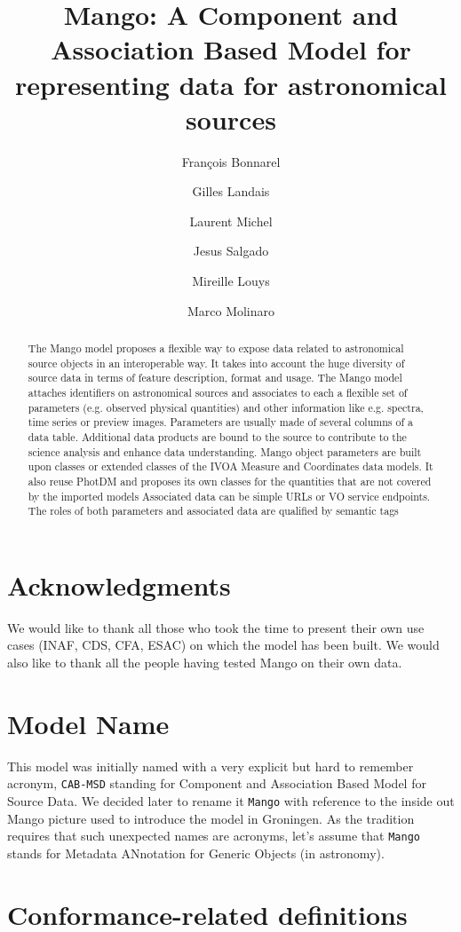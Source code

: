 \documentclass[11pt,a4paper]{ivoa}
\title{Mango: A Component and Association Based Model for representing data for astronomical sources}
\author{François Bonnarel}
\author{Gilles Landais}
\author{Laurent Michel}
\author{Jesus Salgado}
\author{Mireille Louys}
\author{Marco Molinaro}
\begin{document}
\begin{abstract}
The Mango model proposes a flexible way to expose data related to astronomical source objects 
in an interoperable way.
It takes into account the huge diversity of source data in terms of feature description, format and usage.
The Mango model attaches identifiers on astronomical sources and associates to each a flexible 
set of parameters (e.g. observed physical quantities) and other information like e.g. spectra,
time series or preview images.
Parameters are usually made of several columns of a data table.
Additional data products are bound to the source to contribute to the science analysis
and enhance data understanding.
Mango object parameters are built upon classes or extended classes of the IVOA Measure
and Coordinates data models. It also reuse PhotDM and proposes its own classes for the quantities 
that are not covered by the imported models
Associated data can be simple URLs or VO service endpoints.
The roles of both parameters and associated data are qualified by semantic tags

\end{abstract}


\section*{Acknowledgments}

We would like to thank all those who took the time to present their own use cases (INAF, CDS, CFA, ESAC) on which the model has been built.
We would also like to thank all the people having tested Mango on their own data.

\section*{Model Name}
This model was initially named with a very explicit but hard to remember acronym, \texttt{CAB-MSD}
standing for Component and Association Based Model for Source Data.
We decided later to rename it \texttt{Mango} with reference to the inside out Mango
picture used to introduce the model in Groningen. 
As the tradition requires that such unexpected names are acronyms,
let's assume that \texttt{Mango} stands for
Metadata ANnotation for Generic Objects (in astronomy).


\section*{Conformance-related definitions}
\end{document}
